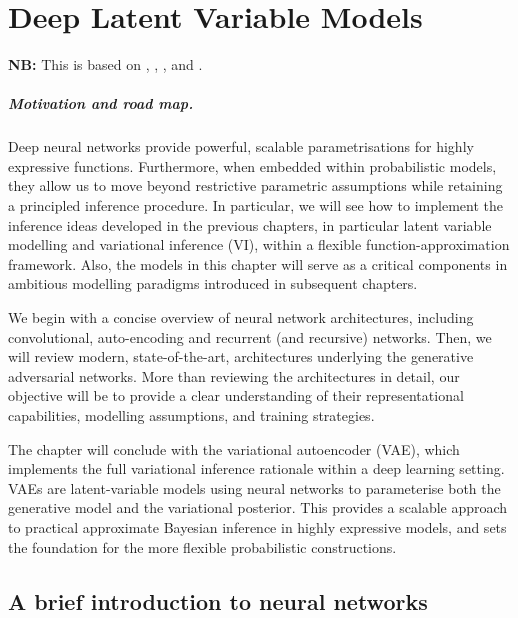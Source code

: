 \chapter{Deep Latent Variable Models}

\textbf{NB:} This is based on \cite{goodfellow2016deep}, \cite{goodfellow2014gan}, \cite{kingma2013auto}, and \cite{kingma2019introductionvae}.

\paragraph{Motivation and road map.}

Deep neural networks provide powerful, scalable parametrisations for highly expressive functions. Furthermore, when embedded within probabilistic models, they allow us to move beyond restrictive parametric assumptions while retaining a principled inference procedure. In particular, we will see how to implement the inference ideas developed in the previous chapters, in particular latent variable modelling and variational inference (VI), within a flexible function-approximation framework. Also, the models in this chapter will serve as a critical components in ambitious modelling paradigms introduced in subsequent chapters.

We begin with a concise overview of neural network architectures, including convolutional, auto-encoding and recurrent (and recursive) networks. Then, we will review modern, state-of-the-art, architectures underlying the generative adversarial networks. More than reviewing the architectures in detail, our objective will be to provide a clear understanding of their representational capabilities, modelling assumptions, and training strategies.

The chapter will conclude with the variational autoencoder (VAE), which implements the full variational inference rationale within a deep learning setting. VAEs are  latent-variable models using neural networks to parameterise both the generative model and the variational posterior. This provides a scalable approach to practical approximate Bayesian inference in highly expressive models, and sets the foundation for the more flexible probabilistic constructions.


\section{A brief introduction to neural networks}

